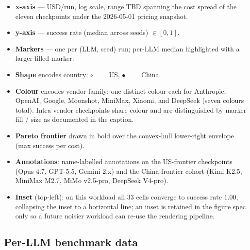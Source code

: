 \begin{itemize}
  \item \textbf{x-axis} --- USD/run, log scale, range TBD spanning
    the cost spread of the eleven checkpoints under the
    2026-05-01 pricing snapshot.
  \item \textbf{y-axis} --- success rate (median across seeds)
    $\in[0,1]$.
  \item \textbf{Markers} --- one per (LLM, seed) run; per-LLM
    median highlighted with a larger filled marker.
  \item \textbf{Shape} encodes country: $\circ$~$=$~US,
    $\bullet$~$=$~China.
  \item \textbf{Colour} encodes vendor family: one distinct colour
    each for Anthropic, OpenAI, Google, Moonshot, MiniMax, Xiaomi,
    and DeepSeek (seven colours total). Intra-vendor checkpoints
    share colour and are distinguished by marker fill / size as
    documented in the caption.
  \item \textbf{Pareto frontier} drawn in bold over the convex-hull
    lower-right envelope (max success per cost).
  \item \textbf{Annotations}: name-labelled annotations on the
    US-frontier checkpoints (Opus 4.7, GPT-5.5, Gemini 2.x) and
    the China-frontier cohort (Kimi K2.5, MiniMax M2.7, MiMo
    v2.5-pro, DeepSeek V4-pro).
  \item \textbf{Inset} (top-left): on this workload all 33 cells
    converge to success rate $1.00$, collapsing the inset to a
    horizontal line; an inset is retained in the figure spec only
    so a future noisier workload can re-use the rendering pipeline.
\end{itemize}


\subsection{Per-LLM benchmark data}
\label{sec:results-table}

